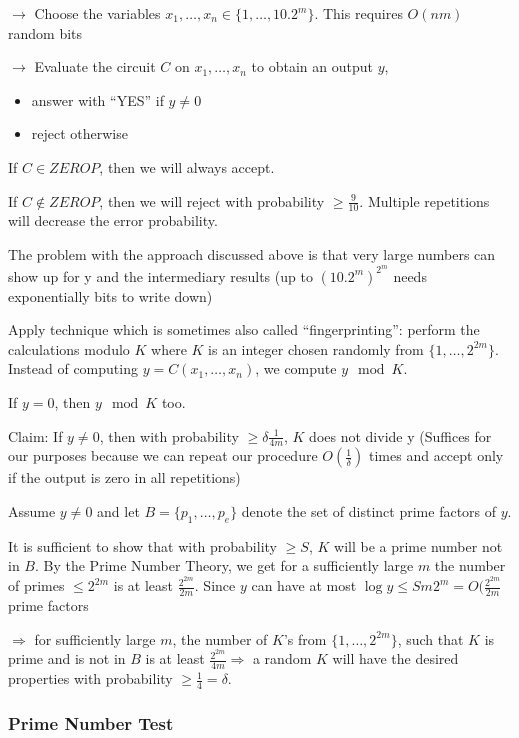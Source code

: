 \documentclass[11pt]{article}
\theoremstyle{definition}
\theoremstyle{definition}
\begin{document}
$ \rightarrow $ Choose the variables $ x_1, \dots, x_n \in \{1, \dots, 10.2^m \} $. %
This requires $O(nm)$ random bits

$ \rightarrow $ Evaluate the circuit $ C $ on $ x_1, \dots, x_n $ to obtain an output $ y $,
\begin{itemize}
\item answer with ``YES'' if $ y \neq 0 $
\item reject otherwise
\end{itemize}

If $ C \in ZERO P $, then we will always accept.

If $ C \not\in ZERO P $, then we will reject with probability $ \geq \frac{9}{10} $. Multiple repetitions will decrease the error probability.

The problem with the approach discussed above is that very large numbers can show up for y and the intermediary results (up to $(10.2^m)^{2^m}$ needs exponentially bits to write down)

Apply technique which is sometimes also called ``fingerprinting'': perform the calculations modulo $ K $ where $ K $ is an integer chosen randomly from $ \{1, \dots, 2^{2m}\} $. Instead of computing $ y = C (x_1, \dots, x_n) $, we compute $ y \mod K $.

If $ y = 0$, then $ y \mod K $ too.

Claim: If $ y \neq 0 $, then with probability $ \geq \delta \frac{1}{4m} $, $ K $ does not divide y
(Suffices for our purposes because we can repeat our procedure $ O (\frac{1}{\delta}) $ times and accept only if the output is zero in all repetitions)

Assume $ y \neq 0 $ and let $ B = \{ p_1, \dots, p_e\} $ denote the set of distinct prime factors of $ y $.

It is sufficient to show that with probability $ \geq S $, $ K $ will be a prime number not in $ B $. By the Prime Number Theory, we get for a sufficiently large $ m $ the number of primes $ \leq 2^{2m} $ is at least $ \frac{2^{2m}}{2m} $. Since $ y $ can have at most $ \log y \leq Sm 2^m = O (\frac{2^{2m}}{2m} $ prime factors

$ \Rightarrow $ for sufficiently large $m$, the number of $ K$'s from $ \{1, \dots, 2^{2m}\}$, such that $ K $ is prime and is not in $ B $ is at least $ \frac{2^{2m}}{4m}  \Rightarrow $ a random $ K $ will have the desired properties with probability $ \geq \frac{1}{4} = \delta $.

\subsubsection{Prime Number Test}
\end{document}
